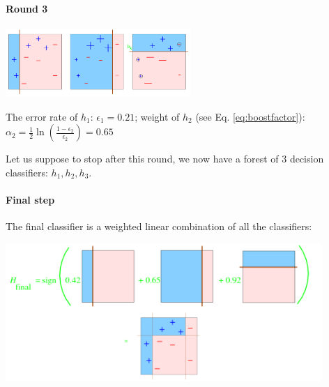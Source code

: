 \begin{appendices}
\paragraph{Round 3}

\begin{center}
\includegraphics[width=7cm]{appendix/img/adaboost4.png}
\end{center}

The error rate of $h_1$: $\epsilon_1 = 0.21$; weight of $h_2$ (see Eq. \ref{eq:boostfactor}): $\alpha_2 = \frac{1}{2} \ln\left(\frac{1-\epsilon_2}{\epsilon_2}\right) = 0.65$

Let us suppose to stop after this round, we now have a forest of 3 decision classifiers: $h_1,h_2,h_3$.

\paragraph{Final step}
The final classifier is a weighted linear combination of all the classifiers:


\begin{center}
\includegraphics[width=12cm]{appendix/img/adaboost5.png}
\end{center}


\end{appendices}